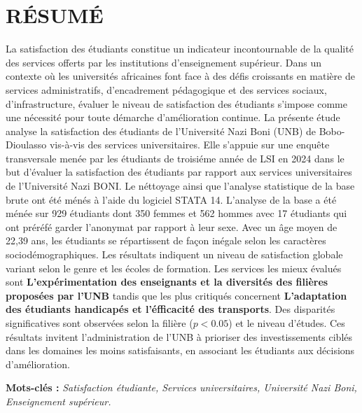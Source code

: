 \documentclass[
12pt,          %
a4paper,       %
oneside,      %
openright      %
]{report}          %
\begin{document}
		\chapter*{R\'ESUM\'E}
		
		La satisfaction des \'etudiants constitue un indicateur incontournable de la qualit\'e
		des services offerts par les institutions d'enseignement sup\'erieur. Dans un
		contexte o\`u les universit\'es africaines font face \`a des d\'efis croissants
		en mati\`ere de services administratifs, d'encadrement p\'edagogique et des services sociaux, d'infrastructure, \'evaluer le niveau de satisfaction des étudiants s'impose comme une n\'ecessit\'e
		pour toute d\'emarche d'am\'elioration continue.
		La pr\'esente \'etude analyse la satisfaction des \'etudiants de l'Universit\'e
		Nazi Boni (UNB) de Bobo-Dioulasso vis-\`a-vis des services universitaires.
		Elle s'appuie sur une enqu\^ete transversale men\'ee par les \'etudiants de troisi\'eme ann\'ee de
		LSI en 2024 dans le but d'\'evaluer la satisfaction des \'etudiants par rapport aux services universitaires de l'Universit\'e Nazi BONI. Le n\'ettoyage ainsi que l'analyse statistique de la base brute ont été m\'en\'es à l'aide du logiciel  STATA 14. 
		L'analyse de la base a \'et\'e m\'en\'ee sur 929 \'etudiants dont 350 femmes et 562 hommes avec 17 \'etudiants qui ont pr\'er\'efé garder l'anonymat par rapport à leur sexe. Avec un \^age moyen de 22,39 ans, les \'etudiants se r\'epartissent de façon in\'egale selon les caract\`eres
		sociod\'emographiques.
		Les r\'esultats indiquent un niveau de satisfaction globale variant selon le genre et les \'ecoles de formation.
		 Les services les mieux \'evalu\'es	sont \textbf{L'expérimentation des enseignants et la diversités des filières proposées par l'UNB} tandis que les plus
		critiqu\'es concernent \textbf{L'adaptation des étudiants handicapés et l'\'efficacit\'e des transports}. Des disparit\'es significatives sont observ\'ees
		selon la fili\`ere ($p < 0.05$) et le niveau d'\'etudes.
		Ces r\'esultats invitent l'administration de l'UNB \`a prioriser
		des investissements cibl\'es dans les domaines les moins satisfaisants,
		en associant les \'etudiants aux d\'ecisions d'am\'elioration.
		
		\vspace{12pt}
		\noindent\textbf{Mots-clés :}
		\textit{Satisfaction \'etudiante, Services universitaires, Universit\'e Nazi Boni, Enseignement sup\'erieur.}
		
\end{document}
